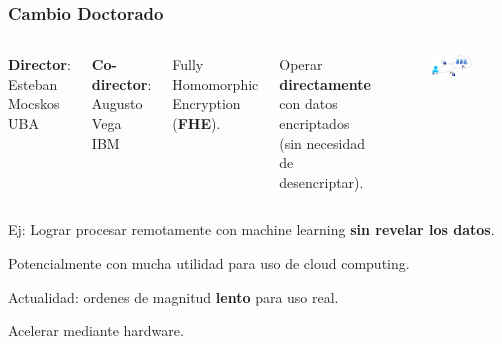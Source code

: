 \documentclass[10pt]{beamer}
\begin{document}
\begin{frame}
\frametitle{Cambio Doctorado}
        \vspace{0.3cm}

\begin{columns}
    \textbf{Director}: Esteban Mocskos UBA
        \vspace{0.3cm}

      \textbf{Co-director}: Augusto Vega IBM

        \vspace{0.3cm}
        Fully Homomorphic Encryption (\textbf{FHE}).

\pause
        \vspace{0.3cm}
        Operar \textbf{directamente} con datos encriptados (sin necesidad de desencriptar).


\begin{figure}[h!]
    \centering
    \includegraphics[scale=0.19]{fhe.jpg}
\end{figure}
\end{columns}


\pause
Ej: Lograr procesar remotamente con machine learning \textbf{sin revelar los datos}.
 \vspace{-0.25cm}

Potencialmente con mucha utilidad para uso de cloud computing.
 \vspace{-0.15cm}

 \pause
 Actualidad: ordenes de magnitud \textbf{lento} para uso real.
 \vspace{-0.15cm}

\pause
\begin{mdframed}[backgroundcolor=frenchblue!20]\centering
  Acelerar mediante hardware.
\end{mdframed}

\end{frame}
\end{document}
